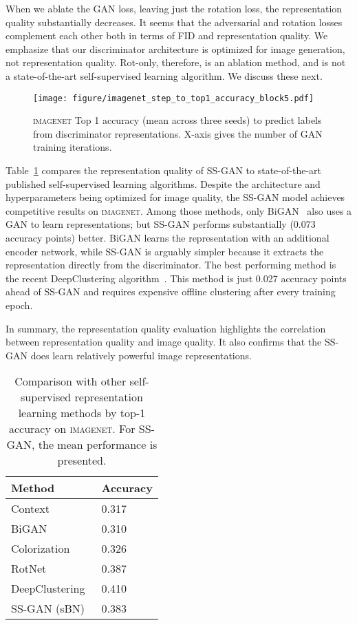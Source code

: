 \documentclass[10pt,twocolumn,letterpaper]{article}
\newcommand{\imagenet}{\textsc{imagenet}}
\begin{document}
When we ablate the GAN loss, leaving just the rotation loss, the representation quality substantially decreases.
It seems that the adversarial and rotation losses complement each other both in terms of FID and representation quality.
We emphasize that our discriminator architecture is optimized for image generation, not representation quality.
Rot-only, therefore, is an ablation method,
and is not a state-of-the-art self-supervised learning algorithm.
We discuss these next.

\begin{figure}[t!]
 \centering
 \texttt{[image: figure/imagenet\_step\_to\_top1\_accuracy\_block5.pdf]}
 \caption{\label{fig:accuracy-steps-imagenet}\imagenet{}
 Top 1 accuracy (mean across three seeds) to predict labels from discriminator representations.
 X-axis gives the number of GAN training iterations.}
\end{figure}

Table~\ref{tab:imagenet_compare} compares the representation quality of SS-GAN to state-of-the-art published self-supervised learning algorithms.
Despite the architecture and hyperparameters being optimized for image quality, the SS-GAN model achieves competitive results on \imagenet{}.
Among those methods, only BiGAN~\citep{donahue2016adversarial} also uses a GAN to learn representations;
but SS-GAN performs substantially (0.073 accuracy points) better.
BiGAN learns the representation with an additional encoder network,
while SS-GAN is arguably simpler because it extracts the representation directly from the discriminator.
The best performing method is the recent DeepClustering algorithm~\citep{caron2018deep}.
This method is just 0.027 accuracy points ahead of SS-GAN and requires expensive offline clustering after every training epoch.

In summary, the representation quality evaluation highlights the correlation between representation quality and image quality.
It also confirms that the SS-GAN does learn relatively powerful image representations.


\begin{table}[h]
\centering
\caption{\label{tab:imagenet_compare} Comparison with other self-supervised representation learning methods by top-1 accuracy on \imagenet{}.
For SS-GAN, the mean performance is presented.}
\begin{tabular}{ll}
  \toprule
  Method                                  & Accuracy \\\midrule
  Context~\citep{doersch2015unsupervised} & 0.317    \\
  BiGAN~\citep{donahue2016adversarial,zhang2017split}    & 0.310    \\
  Colorization~\citep{zhang2016colorful}  & 0.326    \\
  RotNet~\citep{gidaris2018unsupervised}  & 0.387    \\
  DeepClustering~\citep{caron2018deep} & 0.410     \\
  SS-GAN (sBN)                            & 0.383    \\
  \bottomrule
\end{tabular}
 \end{table}
\end{document}
